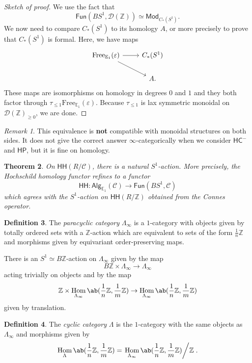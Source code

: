 \documentclass[10pt, oneside]{memoir}
\newtheorem{thm}{Theorem}[subsection]
\theoremstyle{definition}
\newtheorem{defn}[thm]{Definition}
\theoremstyle{remark}
\newtheorem{rmk}[thm]{Remark}
\theoremstyle{plain}
\theoremstyle{definition}
\theoremstyle{remark}
\newcommand{\Z}{\mathbb{Z}}
\newcommand{\E}{\mathbb{E}}
\newcommand{\ep}{\varepsilon}
\newcommand{\mc}[1]{\mathcal{#1}}
\newcommand{\mr}[1]{\mathrm{#1}}
\newcommand{\ms}[1]{\mathsf{#1}}
\newcommand{\1}{\mathbf{1}}
\newcommand{\2}{\mathbf{2}}
\newcommand{\3}{\mathbf{3}}
\newcommand{\HC}{\ms{HC}}
\newcommand{\HH}{\ms{HH}}
\newcommand{\HP}{\ms{HP}}
\DeclareMathOperator{\Hom}{Hom}
\begin{document}
\begin{proof}[Sketch of proof]
    We use the fact that
    \[ \ms{Fun}(BS^1, \mc{D}(\Z)) \simeq \ms{Mod}_{C_*(S^1)}. \]
    We now need to compare \(C_*(S^1) \) to its homology \(A \), or more precisely to prove that \(C_*(S^1) \) is formal. Here, we have maps
    \begin{equation*}
    \begin{tikzcd}
        \mr{Free}_{\E_1}(\ep) \ar{r} \ar{dr} & C_*(S^1) \\
        & A.
    \end{tikzcd}
    \end{equation*}
    These maps are isomorphisms on homology in degrees \(0 \) and \(1 \) and they both factor through \(\tau_{\leq 1} \mr{Free}_{\E_1}(\ep) \). Because \(\tau_{\leq 1} \) is lax symmetric monoidal on \(\mc{D}(\Z)_{\geq 0} \), we are done.
\end{proof}

\begin{rmk}
    This equivalence is \textbf{not} compatible with monoidal structures on both sides. It does not give the correct answer \(\infty \)-categorically when we consider \(\HC^- \) and \(\HP \), but it is fine on homology.
\end{rmk}

\begin{thm}\label{thm:s1action}
    On \(\HH(R/\mc{C}) \), there is a natural \(S^1 \)-action. More precisely, the Hochschild homology functor refines to a functor
    \[ \HH \colon \ms{Alg}_{\E_1}(\mc{C}) \to \ms{Fun}(BS^1, \mc{C}) \]
    which agrees with the \(S^1 \)-action on \(\HH(R/\Z) \) obtained from the Connes operator.
\end{thm}

\begin{defn}
    The \textit{paracyclic category} \(\Lambda_{\infty} \) is a \(1 \)-category with objects given by totally ordered sets with a \(\Z \)-action which are equivalent to sets of the form \(\frac{1}{n} \Z \) and morphisms given by equivariant order-preserving maps.
\end{defn}

There is an \(S^1 \simeq B\Z \)-action on \(\Lambda_{\infty} \) given by the map
\[ B\Z \times \Lambda_{\infty} \to \Lambda_{\infty} \]
acting trivially on objects and by the map
\[ \Z \times \Hom_{\Lambda_{\infty}} \ab(\frac{1}{n}\Z, \frac{1}{m}\Z) \to \Hom_{\Lambda_{\infty}} \ab(\frac{1}{n}\Z, \frac{1}{m}\Z) \]
given by translation.

\begin{defn}
    The \textit{cyclic category} \(\Lambda \) is the \(1 \)-category with the same objects as \(\Lambda_{\infty} \) and morphisms given by
    \[ \Hom_{\Lambda} \ab(\frac{1}{n} \Z, \frac{1}{m}\Z) = \left. \Hom_{\Lambda_{\infty}} \ab(\frac{1}{n}\Z, \frac{1}{m}\Z) \middle/ \Z \right. . \]
\end{defn}
\end{document}
